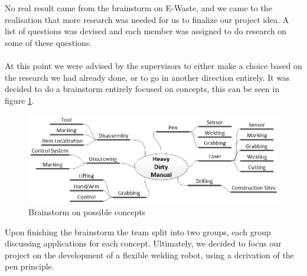 No real result came from the brainstorm on E-Waste, and we came to the realisation that more research was needed for us to finalize our project idea. A list of questions was devised and each member was assigned to do research on some of these questions. \\~~\\
At this point we were advised by the supervisors to either make a choice based on the research we had already done, or to go in another direction entirely. It was decided to do a brainstorm entirely focused on concepts, this can be seen in figure \ref{fig:conceptsBrainstorm}.

\begin{figure}[!ht]
	\centering
	\includegraphics[scale=.5]{./graphics/conceptsBrainstorm.jpg}
	\caption{Brainstorm on possible concepts}
	\label{fig:conceptsBrainstorm}
\end{figure}

Upon finishing the brainstorm the team split into two groups, each group discussing applications for each concept. Ultimately, we decided to focus our project on the development of a flexible welding robot, using a derivation of the pen principle.
